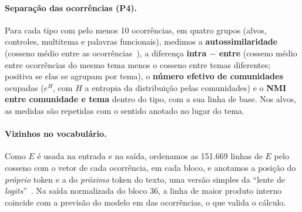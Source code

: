 \paragraph{Separação das ocorrências (P4).} Para cada tipo com pelo menos 10 ocorrências, em
quatro grupos (alvos, controles, multitema e palavras funcionais), medimos a
\textbf{autossimilaridade} (cosseno médio entre as ocorrências~\cite{ethayarajh2019}), a
diferença \textbf{intra $-$ entre} (cosseno médio entre ocorrências do mesmo tema menos o
cosseno entre temas diferentes; positiva se elas se agrupam por tema), o \textbf{número efetivo
de comunidades} ocupadas ($e^{H}$, com $H$ a entropia da distribuição pelas comunidades) e o
\textbf{NMI entre comunidade e tema} dentro do tipo, com a sua linha de base. Nos alvos, as
medidas são repetidas com o sentido anotado no lugar do tema.

\paragraph{Vizinhos no vocabulário.} Como $E$ é usada na entrada e na saída, ordenamos as
151.669 linhas de $E$ pelo cosseno com o vetor de cada ocorrência, em cada bloco, e anotamos a
posição do \emph{próprio} token e a do \emph{próximo} token do texto, uma versão simples da
``lente de \emph{logits}''~\cite{nostalgebraist2020}. Na saída normalizada do bloco 36, a linha
de maior produto interno coincide com a previsão do modelo em \concordanciaPredicao{} das
ocorrências, o que valida o cálculo.
